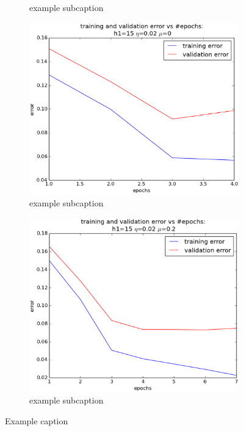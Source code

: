 \begin{itemize}
\begin{figure}[!ht]
\begin{subfigure}[b]{.45\textwidth}
		\caption{example subcaption}
		\label{fig:subfigure2}
		\end{subfigure}
		\begin{subfigure}[b]{.45\textwidth}
		\centering
		\includegraphics[width=\textwidth]{mlp/plots/effect_eta_decrease.eps}
		\caption{example subcaption}
		\label{fig:subfigure3}
		\end{subfigure}
		\quad
		\begin{subfigure}[b]{.45\textwidth}
		\centering
		\includegraphics[width=\textwidth]{mlp/plots/effect_momentum.eps}
		\caption{example subcaption}
		\label{fig:subfigure4}
		\end{subfigure}
		\caption{Example caption}
		\label{fig:example}
		\end{figure}


\end{itemize}
